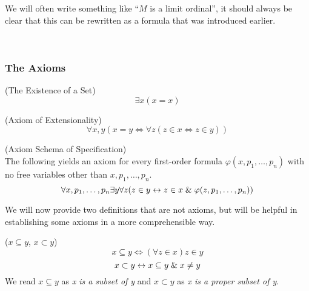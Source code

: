 We will often write something like ``$M$ is a limit ordinal'', it should always be clear that this can be rewritten as a formula that was introduced earlier.

\


\subsubsection{The Axioms}

\begin{definition}{(The Existence of a Set)}\label{def:existence_of_a_set}
\begin{equation}
\exists x (x = x)
\end{equation}
\end{definition}

\begin{definition}{(Axiom of Extensionality)}\label{def:extensionality}
\begin{equation}
\forall x, y (x = y \iff \forall z (z \in x \iff z \in y)) %
\end{equation}
\end{definition}

\begin{definition}{(Axiom Schema of Specification)}\label{def:specification}\\
The following yields an axiom for every first-order formula $\varphi(x, p_1, \ldots, p_n)$ with no free variables other than $x, p_1, \ldots, p_n$.
\begin{equation}
\forall x, p_1, \ldots, p_n \exists y \forall z ( z \in y \iff z \in x \et \varphi(z, p_1, \ldots, p_n)) %
\end{equation}
\end{definition}

We will now provide two definitions that are not axioms, but will be helpful in establishing some axioms in a more comprehensible way.
\begin{definition}{($x \subseteq y$, $x \subset y$)}\label{def:subset}
\begin{equation}
x \subseteq y \iff (\forall z \in x) z \in y
\end{equation}
\begin{equation}
x \subset y \leftrightarrow x \subseteq y \mathrel{\&} x \neq y
\end{equation}
We read $x \subseteq y$ as \emph{x is a subset of y} and $x \subset y$ as \emph{x is a proper subset of y}.
\end{definition}

